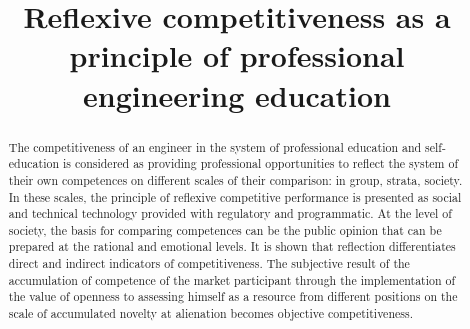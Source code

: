 \documentclass[conference]{IEEEtran}
\begin{document}
\title{Reflexive competitiveness as a principle of professional engineering education}


\author{
	\and
	\and
	\and
	\and
}

\maketitle

\begin{abstract}
The competitiveness of an engineer in the system of professional education and self-education is considered as providing professional opportunities to reflect the system of their own competences on different scales of their comparison: in group, strata, society. In these scales, the principle of reflexive competitive performance is presented as social and technical technology provided with regulatory and programmatic. At the level of society, the basis for comparing competences can be the public opinion that can be prepared at the rational and emotional levels. It is shown that reflection differentiates direct and indirect indicators of competitiveness. The subjective result of the accumulation of competence of the market participant through the implementation of the value of openness to assessing himself as a resource from different positions on the scale of accumulated novelty at alienation becomes objective competitiveness.
\end{abstract}
\end{document}
